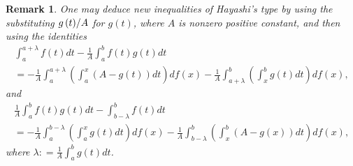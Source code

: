 \documentclass{amsart}
\theoremstyle{plain}
\newtheorem{remark}{Remark}
\numberwithin{equation}{section}
\begin{document}
\begin{remark}
One may deduce new inequalities of Hayashi's type by using the
substituting $ {{g\left( t \right)} \mathord{\left/
 {\vphantom {{g\left( t \right)} A}} \right.
 \kern-\nulldelimiterspace} A}$ for $g\left( t \right)$, where $A$ is nonzero positive
 constant, and then using the identities
 \begin{multline}
\label{eq2.18}\int_a^{a + \lambda } {f\left( t \right)dt}  -
\frac{1}{A} \int_a^b {f\left( t \right)g\left( t \right)dt}
\\
= - \frac{1}{A} \int_a^{a + \lambda } {\left( {\int_a^x {\left( {A
- g\left( t \right)} \right)dt} } \right)df\left( x \right)} -
\frac{1}{A} \int_{a + \lambda }^b {\left( {\int_x^b {g\left( t
\right)dt} } \right)df\left( x \right)} ,
\end{multline}
and
\begin{multline}
\label{eq2.19} \frac{1}{A}\int_a^b {f\left( t \right)g\left( t
\right)dt - \int_{b - \lambda }^b {f\left( t \right)dt} }
\\
=  - \frac{1}{A}\int_a^{b - \lambda } {\left( {\int_a^x {g(t)dt} }
\right)df\left( x \right)}  - \frac{1}{A} \int_{b - \lambda }^b
{\left( {\int_x^b {\left( {A - g\left( x \right)} \right)dt} }
\right)df\left( x \right)},
\end{multline}
where $\lambda : = \frac{1}{A}\int_a^b {g\left( t \right)dt}$.

\end{remark}
\end{document}
